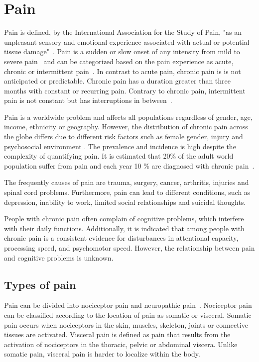 \section{Pain} \label{sec:Pain}
Pain is defined, by the International Association for the Study of Pain, "as an unpleasant sensory and emotional experience associated with actual or potential tissue damage"~\cite{Kerstman2013}. 
Pain is a sudden or slow onset of any intensity from mild to severe pain~\cite{Mello2016} and can be categorized based on the pain experience as acute, chronic or intermittent pain~\cite{Goldberg2011}. In contrast to acute pain, chronic pain is is not anticipated or predictable. Chronic pain has a duration greater than three months with constant or recurring pain. Contrary to chronic pain, intermittent pain is not constant but has interruptions in between~\cite{Mello2016}.

Pain is a worldwide problem and affects all populations regardless of gender, age, income, ethnicity or geography. However, the distribution of chronic pain across the globe differs due to different risk factors such as female gender, injury and psychosocial environment \cite{Macfarlanea2016}.  The prevalence and incidence is high despite the complexity of quantifying pain. It is estimated that 20\% of the adult world population suffer from pain and each year 10 \% are diagnosed with chronic pain~\cite{Goldberg2011}. 

The frequently causes of pain are trauma, surgery, cancer, arthritis, injuries and spinal cord problems. Furthermore, pain can lead to different conditions, such as depression, inability to work, limited social relationships and suicidal thoughts.~\cite{Goldberg2011, Breivik2006}

People with chronic pain often complain of cognitive problems, which interfere with their daily functions. Additionally, it is indicated that among people with chronic pain is a consistent evidence for disturbances in attentional capacity, processing speed, and psychomotor speed. However, the relationship between pain and cognitive problems is unknown.~\cite{Geisser2018}

\subsection{Types of pain}
Pain can be divided into nociceptor pain and neuropathic pain~\cite{Steeds2013}. Nociceptor pain can be classified according to the location of pain as somatic or visceral. Somatic pain occurs when nociceptors in the skin, muscles, skeleton, joints or connective tissues are activated. Visceral pain is defined as pain that results from the activation of nociceptors in the thoracic, pelvic or abdominal viscera. Unlike somatic pain, visceral pain is harder to localize within the body. \cite{Kerstman2013} 

